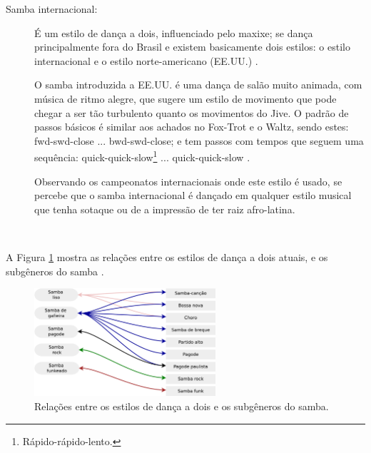 \begin{description}
 

\item[Samba internacional:] 
É um estilo de dança a dois, influenciado pelo maxixe;
se dança principalmente fora do Brasil e existem basicamente dois estilos: 
o estilo internacional e o estilo norte-americano (EE.UU.) \cite[pp. 134-135]{perna2002samba}.

O samba introduzida a EE.UU. é uma dança de salão muito animada, 
com música de ritmo alegre, que sugere um estilo de movimento que pode
chegar a ser tão turbulento quanto os movimentos do Jive.
O padrão de passos básicos é similar aos achados no Fox-Trot e o Waltz,
sendo estes: fwd-swd-close ... bwd-swd-close; e
tem passos com tempos que seguem uma sequência: 
quick-quick-slow\footnote{Rápido-rápido-lento.} ... quick-quick-slow \cite{parson2016ballroom}.

Observando os campeonatos internacionais onde este estilo é usado, 
se percebe que o samba internacional é dançado em qualquer estilo musical que
tenha sotaque ou de a impressão de ter raiz afro-latina.

\end{description}~

A Figura \ref{fig:sambadavavsmusica} mostra as relações entre os estilos de dança a dois atuais,
 e os subgêneros do samba \cite[pp. 134-138]{perna2002samba}.

\begin{figure}[h]
  \centering
    \includegraphics[width=0.6\textwidth]{chapters/cap-historia-musicasamba/dancavcmusica.eps}
  \caption{Relações entre os estilos de dança a dois e os subgêneros do samba.}
\label{fig:sambadavavsmusica}
\end{figure}


